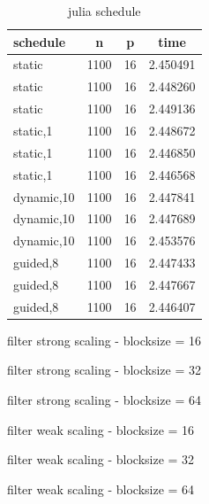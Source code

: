 \documentclass[a4paper,%
7pt,%
DIV12,
headsepline,%
headings=normal,
]{scrartcl}
\begin{document}
\begin{table}[htbp]
    \centering
    \begin{tabular}{|l|c|c|c|}
        \hline
        schedule & n & p & time \\
        \hline
        static & 1100 & 16 & 2.450491 \\
        static & 1100 & 16 & 2.448260 \\
        static & 1100 & 16 & 2.449136 \\
        static,1 & 1100 & 16 & 2.448672 \\
        static,1 & 1100 & 16 & 2.446850 \\
        static,1 & 1100 & 16 & 2.446568 \\
        dynamic,10 & 1100 & 16 & 2.447841 \\
        dynamic,10 & 1100 & 16 & 2.447689 \\
        dynamic,10 & 1100 & 16 & 2.453576 \\
        guided,8 & 1100 & 16 & 2.447433 \\
        guided,8 & 1100 & 16 & 2.447667 \\
        guided,8 & 1100 & 16 & 2.446407 \\
        \hline
    \end{tabular}
    \caption{julia schedule}
\end{table}

\begin{table}[htbp]
\centering
{}
\caption{filter strong scaling - blocksize = 16}
\label{tab:label1}
\end{table}

\begin{table}[htbp]
\centering
{}
\caption{filter strong scaling - blocksize = 32}
\label{tab:label2}
\end{table}

\begin{table}[htbp]
\centering
{}
\caption{filter strong scaling - blocksize = 64}
\label{tab:label3}
\end{table}

\begin{table}[htbp]
\centering
{}
\caption{filter weak scaling - blocksize = 16}
\label{tab:label4}
\end{table}

\begin{table}[htbp]
\centering
{}
\caption{filter weak scaling - blocksize = 32}
\label{tab:label5}
\end{table}

\begin{table}[htbp]
\centering
{}
\caption{filter weak scaling - blocksize = 64}
\label{tab:label6}
\end{table}
\end{document}
